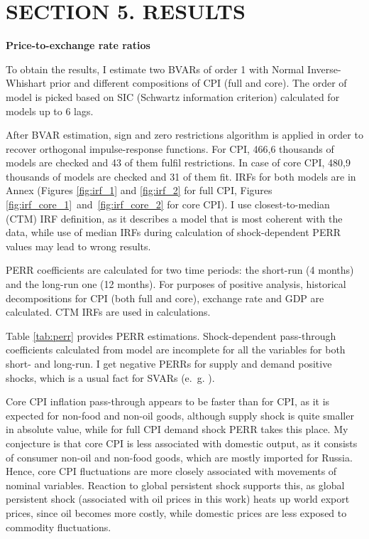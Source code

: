 \documentclass[12pt, a4paper]{extarticle}
\begin{document}
\clearpage
\section*{SECTION 5. RESULTS}
\setcounter{section}{4}
\setcounter{subsection}{0}

\begin{center}
	\textbf{Price-to-exchange rate ratios}
\end{center}

To obtain the results, I estimate two BVARs of order 1 with Normal Inverse-Whishart prior and different compositions of CPI (full and core). The order of model is picked based on SIC (Schwartz information criterion) calculated for models up to 6 lags.

After BVAR estimation, sign and zero restrictions algorithm is applied in order to recover orthogonal impulse-response functions. For CPI, 466,6 thousands of models are checked and 43 of them fulfil restrictions. In case of core CPI, 480,9 thousands of models are checked and 31 of them fit. IRFs for both models are in Annex (Figures \ref{fig:irf_1} and \ref{fig:irf_2} for full CPI, Figures \ref{fig:irf_core_1}~and~\ref{fig:irf_core_2} for core CPI). I use closest-to-median (CTM) IRF definition, as it describes a model that is most coherent with the data, while use of median IRFs during calculation of shock-dependent PERR values may lead to wrong results.

PERR coefficients are calculated for two time periods: the short-run (4 months) and the long-run one (12 months). For purposes of positive analysis, historical decompositions for CPI (both full and core), exchange rate and GDP are calculated. CTM IRFs are used in calculations.

Table \ref{tab:perr} provides PERR estimations. Shock-dependent pass-through coefficients calculated from model are incomplete for all the variables for both short- and long-run. I get negative PERRs for supply and demand positive shocks, which is a usual fact for SVARs (e.~g. \cite[p.~55]{Ortega2020}).

Core CPI inflation pass-through appears to be faster than for CPI, as it is expected for non-food and non-oil goods, although supply shock is quite smaller in absolute value, while for full CPI demand shock PERR takes this place. My conjecture is that core CPI is less associated with domestic output, as it consists of consumer non-oil and non-food goods, which are mostly imported for Russia. Hence, core CPI fluctuations are more closely associated with movements of nominal variables. Reaction to global persistent shock supports this, as global persistent shock (associated with oil prices in this work) heats up world export prices, since oil becomes more costly, while domestic prices are less exposed to commodity fluctuations. 
\end{document}
